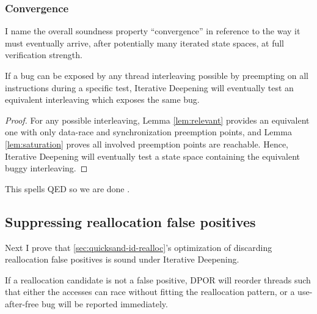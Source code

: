 \subsubsection{Convergence}

I name the overall soundness property ``convergence''
in reference to the way it must eventually arrive,
after potentially many iterated state spaces,
at full verification strength.

\begin{theorem}[Convergence]
	If a bug can be exposed by any thread interleaving possible
	by preempting on all instructions during a specific test,
	Iterative Deepening will eventually test an equivalent interleaving which exposes the same bug.
        \label{thm:convergence}
\end{theorem}

\begin{proof}
	For any possible interleaving,
	Lemma \ref{lem:relevant} provides an equivalent one with only data-race and synchronization preemption points,
	and Lemma \ref{lem:saturation} proves all involved preemption points are reachable.
	Hence, Iterative Deepening will eventually test a state space containing the equivalent buggy interleaving.
\end{proof}

This spells QED so we are done \cite{vargomax}. %

\subsection{Suppressing reallocation false positives}
\label{sec:quicksand-realloc}

Next I prove that \cref{sec:quicksand-id-realloc}'s optimization
of discarding reallocation false positives is sound under Iterative Deepening.

\begin{theorem}
        If a reallocation candidate is not a false positive,
DPOR will reorder threads such that
either
the accesses can race without fitting the reallocation pattern,
or a use-after-free bug will be reported immediately.
\end{theorem}

